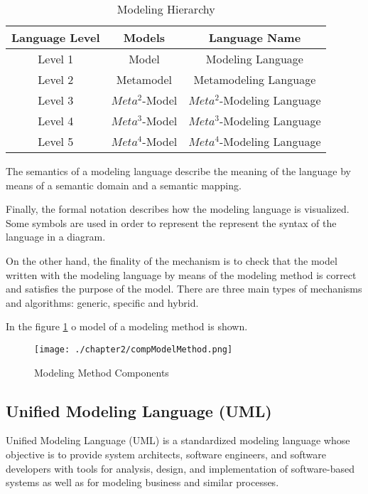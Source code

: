 \begin{table}[h!]
\centering
	\begin{tabular}{||c|c|c||} 
	\hline\hline
	Language Level & Models & Language Name \\ [1ex] 
	\hline\hline
	Level 1 & Model & Modeling Language  \\
	\hline
	Level 2 & Metamodel & Metamodeling Language  \\
	\hline
	Level 3 & $Meta^2$-Model & $Meta^2$-Modeling Language  \\
	\hline
	Level 4 & $Meta^3$-Model & $Meta^3$-Modeling Language  \\
	\hline
	Level 5 & $Meta^4$-Model & $Meta^4$-Modeling Language  \\
	\hline\hline
	\end{tabular}
\caption{Modeling Hierarchy}
\label{Modeling Hierarchy}
\end{table}

The semantics of a modeling language describe the meaning of the language by means of a semantic domain and a semantic mapping.

Finally, the formal notation describes how the modeling language is visualized. Some symbols are used in order to represent the represent the syntax of the language in a diagram.

On the other hand, the finality of the mechanism is to check that the model written with the modeling language by means of the modeling method is correct and satisfies the purpose of the model. There are three main types of mechanisms and algorithms: generic, specific and hybrid.

In the figure \ref{fig:Modeling Method Components} o model of a modeling method is shown.

\begin{figure}
\centering
{\texttt{[image: ./chapter2/compModelMethod.png]}}
\caption{Modeling Method Components}
\label{fig:Modeling Method Components}
\end{figure}

\subsection{Unified Modeling Language (UML)}

Unified Modeling Language (UML) is a standardized modeling language whose objective is to provide system architects, software engineers, and software developers with tools for analysis, design, and implementation of software-based systems as well as for modeling business and similar processes.


